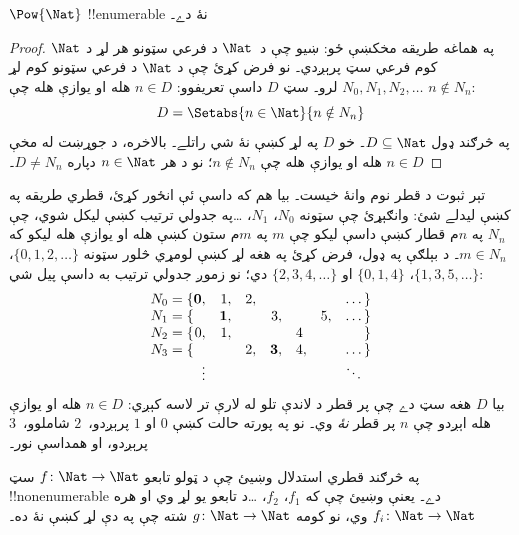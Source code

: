 \documentclass[../../../include/open-logic-section]{subfiles}
\begin{document}
\begin{thm}
$\Pow{\Nat}$ !!{enumerable} نۀ دے۔
\end{thm}

\begin{proof}
په هماغه طريقه مخکښې ځو: ښيو چې د~$\Nat$ د فرعي سټونو هر لړ
د $\Nat$ کوم فرعي سټ پرېږدي۔ نو فرض کړئ چې د $\Nat$ د فرعي
سټونو کوم لړ $N_0, N_1, N_2, \ldots$ لرو۔ سټ $D$ داسې تعريفوو:
$n \in D$ هله او يوازې هله چې $n \notin N_{n}$:
\[
D = \Setabs{n \in \Nat}{n \notin N_n}
\]
په څرګند ډول $D\subseteq \Nat$۔ خو $D$ په لړ کښې نۀ شي راتلے۔
بالاخره، د جوړښت له مخې $n \in D$ هله او يوازې هله چې
$n\notin N_n$؛ نو د هر $n \in \Nat$ دپاره $D \neq N_n$۔
\end{proof}

\begin{explain}
تېر ثبوت د قطر نوم وانۀ خيست۔ بيا هم که داسې ئې انځور کړئ، قطري
طريقه په کښې ليدلے شئ: وانګېړئ چې سټونه $N_0$، $N_1$، \dots په
جدولي ترتيب کښې ليکل شوي، چې $N_n$ په $n$م قطار کښې داسې ليکو
چې $m$ په $m$م ستون کښې هله او يوازې هله ليکو که $m \in N_n$۔
د بېلګې په ډول، فرض کړئ په هغه لړ کښې لومړي څلور سټونه
$\{0,1,2,\dots\}$، $\{1, 3, 5, \dots\}$، $\{0,1,4\}$ او
$\{2,3,4,\dots\}$ دي؛ نو زموږ جدولي ترتيب به داسې پيل شي:
\[
\begin{array}{r@{}rrrrrrr}
  N_0 = \{ & \mathbf{0}, & 1, & 2, & & & & \dots\}\\
  N_1 = \{ &  & \mathbf{1}, &  & 3, &  & 5, & \dots\}\\
  N_2 = \{ & 0, & 1, &  &  & 4\phantom{,} &  & \}\\
  N_3 = \{ &  &  & 2, & \mathbf{3}, & 4, & & \dots\}\\
  &\vdots & & & & & & \ddots\phantom{\}}
  \end{array}
\]
بيا $D$ هغه سټ دے چې پر قطر د لاندې تلو له لارې تر لاسه کېږي:
$n \in D$ هله او يوازې هله اېږدو چې $n$ پر قطر \emph{نۀ} وي۔
نو په پورته حالت کښې $0$ او $1$ پرېږدو،~$2$ شاملوو،~$3$
پرېږدو، او همداسې نور۔
\end{explain}

\begin{prob}
په څرګند قطري استدلال وښيئ چې د ټولو تابعو
$f \colon \Nat \to \Nat$ سټ !!{nonenumerable} دے۔ يعنې وښيئ
چې که $f_1$، $f_2$، \dots د تابعو يو لړ وي او هره
$f_i\colon \Nat \to \Nat$ وي، نو کومه $g \colon \Nat \to
\Nat$ شته چې په دې لړ کښې نۀ ده۔
\end{prob}
\end{document}
